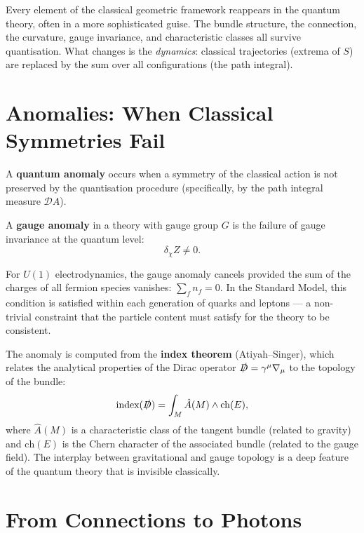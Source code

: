 Every element of the classical geometric framework reappears in the quantum theory, often in a more sophisticated guise. The bundle structure, the connection, the curvature, gauge invariance, and characteristic classes all survive quantisation. What changes is the \emph{dynamics}: classical trajectories (extrema of $S$) are replaced by the sum over all configurations (the path integral).

\section{Anomalies: When Classical Symmetries Fail}

A \textbf{quantum anomaly} occurs when a symmetry of the classical action is not preserved by the quantisation procedure (specifically, by the path integral measure $\mathcal{D}A$).

\begin{definition}
A \textbf{gauge anomaly} in a theory with gauge group $G$ is the failure of gauge invariance at the quantum level:
\begin{equation}
\delta_\chi Z \neq 0.
\end{equation}
\end{definition}

For $U(1)$ electrodynamics, the gauge anomaly cancels provided the sum of the charges of all fermion species vanishes: $\sum_f n_f = 0$. In the Standard Model, this condition is satisfied within each generation of quarks and leptons --- a non-trivial constraint that the particle content must satisfy for the theory to be consistent.

The anomaly is computed from the \textbf{index theorem} (Atiyah--Singer), which relates the analytical properties of the Dirac operator $\slashed{D} = \gamma^\mu\nabla_\mu$ to the topology of the bundle:
\begin{equation}
\text{index}(\slashed{D}) = \int_M \hat{A}(M) \wedge \mathrm{ch}(E),
\end{equation}
where $\hat{A}(M)$ is a characteristic class of the tangent bundle (related to gravity) and $\mathrm{ch}(E)$ is the Chern character of the associated bundle (related to the gauge field). The interplay between gravitational and gauge topology is a deep feature of the quantum theory that is invisible classically.

\section{From Connections to Photons}

